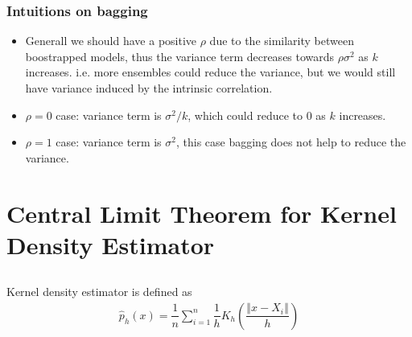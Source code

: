 \documentclass[11pt,a4paper]{ctexart}
\numberwithin{equation}{section}%
\begin{document}
\subsubsection{Intuitions on bagging}

\begin{itemize}[topsep=2pt,itemsep=0pt]
    \item Generall we should have a positive $ \rho  $ due to the similarity between boostrapped models, thus the variance term decreases towards $ \rho \sigma ^2 $ as $ k $ increases. i.e. more ensembles could reduce the variance, but we would still have variance induced by the intrinsic correlation.
    \item $ \rho =0 $ case: variance term is $ \sigma ^2/k $, which could reduce to $ 0 $ as $ k $ increases.
    \item $ \rho =1 $ case: variance term is $ \sigma ^2 $, this case bagging does not help to reduce the variance.
\end{itemize}

\section{Central Limit Theorem for Kernel Density Estimator}

\subsection{}

Kernel density estimator is defined as
\begin{align*}
    \hat{p}_h(x) = \dfrac{1}{n}\sum_{i=1}^n \dfrac{ 1 }{ h }  K_h(\dfrac{ \left\Vert x-X_i \right\Vert  }{ h } )
\end{align*}
\end{document}
